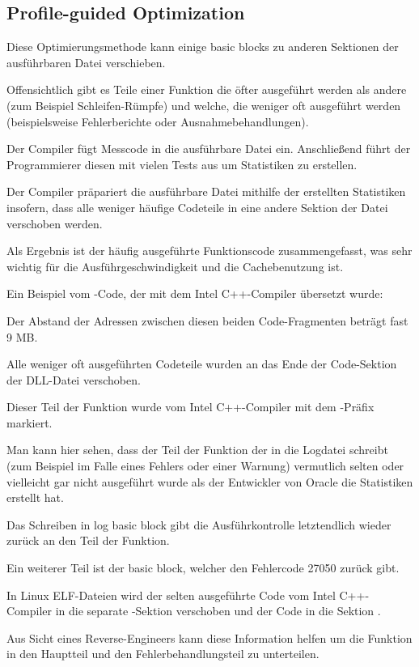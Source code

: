 

\subsection{Profile-guided Optimization}
\label{PGO}

\myindex{\oracle}

Diese Optimierungsmethode kann einige \gls{basic block}s zu anderen Sektionen der
ausführbaren Datei verschieben.

Offensichtlich gibt es Teile einer Funktion die öfter ausgeführt werden als andere
(zum Beispiel Schleifen-Rümpfe) und welche, die weniger oft ausgeführt werden
(beispielsweise Fehlerberichte oder Ausnahmebehandlungen).

Der Compiler fügt Messcode in die ausführbare Datei ein. Anschließend führt der
Programmierer diesen mit vielen Tests aus um Statistiken zu erstellen.

Der Compiler präpariert die ausführbare Datei mithilfe der erstellten Statistiken
insofern, dass alle weniger häufige Codeteile in eine andere Sektion der Datei
verschoben werden.

Als Ergebnis ist der häufig ausgeführte Funktionscode zusammengefasst, was sehr
wichtig für die Ausführgeschwindigkeit und die Cachebenutzung ist.

Ein Beispiel vom \oracle-Code, der mit dem Intel C++-Compiler übersetzt wurde:



Der Abstand der Adressen zwischen diesen beiden Code-Fragmenten beträgt fast 9 MB.

Alle weniger oft ausgeführten Codeteile wurden an das Ende der Code-Sektion der
DLL-Datei verschoben.

Dieser Teil der Funktion wurde vom Intel C++-Compiler mit dem -Präfix
markiert.

Man kann hier sehen, dass der Teil der Funktion der in die Logdatei schreibt (zum
Beispiel im Falle eines Fehlers oder einer Warnung) vermutlich selten oder vielleicht
gar nicht ausgeführt wurde als der Entwickler von Oracle die Statistiken erstellt hat.

Das Schreiben in log basic block gibt die Ausführkontrolle letztendlich wieder zurück
an den  Teil der Funktion.

Ein weiterer  Teil ist der \gls{basic block}, welcher den Fehlercode
27050 zurück gibt.

In Linux ELF-Dateien wird der selten ausgeführte Code vom Intel C++-Compiler in die
separate -Sektion verschoben und der  Code in die Sektion
.

Aus Sicht eines Reverse-Engineers kann diese Information helfen um die Funktion in
den Hauptteil und den Fehlerbehandlungsteil zu unterteilen.
